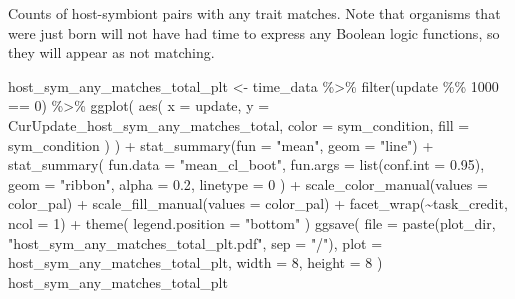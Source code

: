 \documentclass[
]{book}
\newenvironment{Shaded}{\begin{snugshade}}{\end{snugshade}}
\newcommand{\AttributeTok}[1]{\textcolor[rgb]{0.77,0.63,0.00}{#1}}
\newcommand{\DecValTok}[1]{\textcolor[rgb]{0.00,0.00,0.81}{#1}}
\newcommand{\FloatTok}[1]{\textcolor[rgb]{0.00,0.00,0.81}{#1}}
\newcommand{\FunctionTok}[1]{\textcolor[rgb]{0.00,0.00,0.00}{#1}}
\newcommand{\NormalTok}[1]{#1}
\newcommand{\OtherTok}[1]{\textcolor[rgb]{0.56,0.35,0.01}{#1}}
\newcommand{\SpecialCharTok}[1]{\textcolor[rgb]{0.00,0.00,0.00}{#1}}
\newcommand{\StringTok}[1]{\textcolor[rgb]{0.31,0.60,0.02}{#1}}
\begin{document}
Counts of host-symbiont pairs with any trait matches.
Note that organisms that were just born will not have had time to express any
Boolean logic functions, so they will appear as not matching.

\begin{Shaded}
\begin{Highlighting}[]
\NormalTok{host\_sym\_any\_matches\_total\_plt }\OtherTok{\textless{}{-}}\NormalTok{ time\_data }\SpecialCharTok{\%\textgreater{}\%}
  \FunctionTok{filter}\NormalTok{(update }\SpecialCharTok{\%\%} \DecValTok{1000} \SpecialCharTok{==} \DecValTok{0}\NormalTok{) }\SpecialCharTok{\%\textgreater{}\%}
  \FunctionTok{ggplot}\NormalTok{(}
    \FunctionTok{aes}\NormalTok{(}
      \AttributeTok{x =}\NormalTok{ update,}
      \AttributeTok{y =}\NormalTok{ CurUpdate\_host\_sym\_any\_matches\_total,}
      \AttributeTok{color =}\NormalTok{ sym\_condition,}
      \AttributeTok{fill =}\NormalTok{ sym\_condition}
\NormalTok{    )}
\NormalTok{  ) }\SpecialCharTok{+}
  \FunctionTok{stat\_summary}\NormalTok{(}\AttributeTok{fun =} \StringTok{"mean"}\NormalTok{, }\AttributeTok{geom =} \StringTok{"line"}\NormalTok{) }\SpecialCharTok{+}
  \FunctionTok{stat\_summary}\NormalTok{(}
    \AttributeTok{fun.data =} \StringTok{"mean\_cl\_boot"}\NormalTok{,}
    \AttributeTok{fun.args =} \FunctionTok{list}\NormalTok{(}\AttributeTok{conf.int =} \FloatTok{0.95}\NormalTok{),}
    \AttributeTok{geom =} \StringTok{"ribbon"}\NormalTok{,}
    \AttributeTok{alpha =} \FloatTok{0.2}\NormalTok{,}
    \AttributeTok{linetype =} \DecValTok{0}
\NormalTok{  ) }\SpecialCharTok{+}
  \FunctionTok{scale\_color\_manual}\NormalTok{(}\AttributeTok{values =}\NormalTok{ color\_pal) }\SpecialCharTok{+}
  \FunctionTok{scale\_fill\_manual}\NormalTok{(}\AttributeTok{values =}\NormalTok{ color\_pal) }\SpecialCharTok{+}
  \FunctionTok{facet\_wrap}\NormalTok{(}\SpecialCharTok{\textasciitilde{}}\NormalTok{task\_credit, }\AttributeTok{ncol =} \DecValTok{1}\NormalTok{) }\SpecialCharTok{+}
  \FunctionTok{theme}\NormalTok{(}
    \AttributeTok{legend.position =} \StringTok{"bottom"}
\NormalTok{  )}
\FunctionTok{ggsave}\NormalTok{(}
  \AttributeTok{file =} \FunctionTok{paste}\NormalTok{(plot\_dir, }\StringTok{"host\_sym\_any\_matches\_total\_plt.pdf"}\NormalTok{, }\AttributeTok{sep =} \StringTok{"/"}\NormalTok{),}
  \AttributeTok{plot =}\NormalTok{ host\_sym\_any\_matches\_total\_plt,}
  \AttributeTok{width =} \DecValTok{8}\NormalTok{,}
  \AttributeTok{height =} \DecValTok{8}
\NormalTok{)}
\NormalTok{host\_sym\_any\_matches\_total\_plt}
\end{Highlighting}
\end{Shaded}
\end{document}
